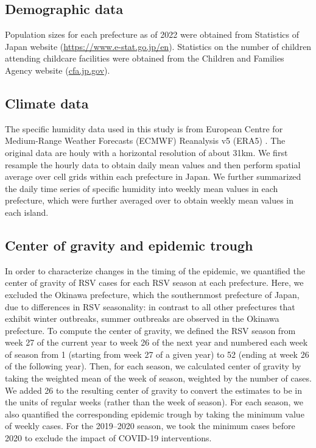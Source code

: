 \documentclass[12pt]{article}
\begin{document}
\subsection*{Demographic data}

Population sizes for each prefecture as of 2022 were obtained from Statistics of Japan website (\url{https://www.e-stat.go.jp/en}).
Statistics on the number of children attending childcare facilities were obtained from the Children and Families Agency website (\url{cfa.jp.gov}).

\subsection*{Climate data}

The specific humidity data used in this study is from European Centre for Medium-Range Weather Forecasts (ECMWF) Reanalysis v5 (ERA5) \citep{hersbach2020era5}. The original data are houly with a horizontal resolution of about 31km. 
We first resample the hourly data to obtain daily mean values and then perform spatial average over cell grids within each prefecture in Japan. 
We further summarized the daily time series of specific humidity into weekly mean values in each prefecture, which were further averaged over to obtain weekly mean values in each island.

\subsection*{Center of gravity and epidemic trough}

In order to characterize changes in the timing of the epidemic, we quantified the center of gravity of RSV cases for each RSV season at each prefecture.
Here, we excluded the Okinawa prefecture, which the southernmost prefecture of Japan, due to differences in RSV seasonality:
in contrast to all other prefectures that exhibit winter outbreaks, summer outbreaks are observed in the Okinawa prefecture.
To compute the center of gravity, we defined the RSV season from week 27 of the current year to week 26 of the next year and numbered each week of season from 1 (starting from week 27 of a given year) to 52 (ending at week 26 of the following year).
Then, for each season, we calculated center of gravity by taking the weighted mean of the week of season, weighted by the number of cases.
We added 26 to the resulting center of gravity to convert the estimates to be in the units of regular weeks (rather than the week of season).
For each season, we also quantified the corresponding epidemic trough by taking the minimum value of weekly cases.
For the 2019--2020 season, we took the minimum cases before 2020 to exclude the impact of COVID-19 interventions.
\end{document}
